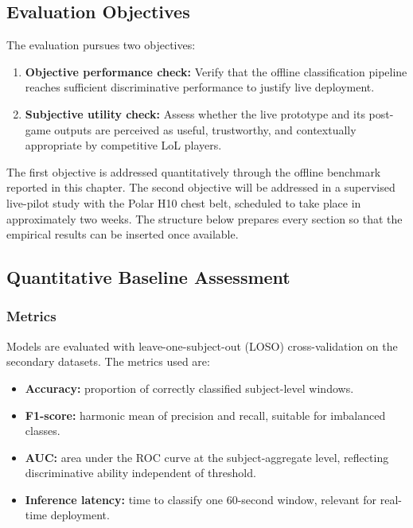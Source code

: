 \subsection{Evaluation Objectives}

The evaluation pursues two objectives:

\begin{enumerate}
    \item \textbf{Objective performance check:} Verify that the offline classification pipeline reaches sufficient discriminative performance to justify live deployment.
    \item \textbf{Subjective utility check:} Assess whether the live prototype and its post-game outputs are perceived as useful, trustworthy, and contextually appropriate by competitive LoL players.
\end{enumerate}

The first objective is addressed quantitatively through the offline benchmark reported in this chapter. The second objective will be addressed in a supervised live-pilot study with the Polar H10 chest belt, scheduled to take place in approximately two weeks. The structure below prepares every section so that the empirical results can be inserted once available.

\subsection{Quantitative Baseline Assessment}

\subsubsection{Metrics}

Models are evaluated with leave-one-subject-out (LOSO) cross-validation on the secondary datasets. The metrics used are:

\begin{itemize}
    \item \textbf{Accuracy:} proportion of correctly classified subject-level windows.
    \item \textbf{F1-score:} harmonic mean of precision and recall, suitable for imbalanced classes.
    \item \textbf{AUC:} area under the ROC curve at the subject-aggregate level, reflecting discriminative ability independent of threshold.
    \item \textbf{Inference latency:} time to classify one 60-second window, relevant for real-time deployment.
\end{itemize}

